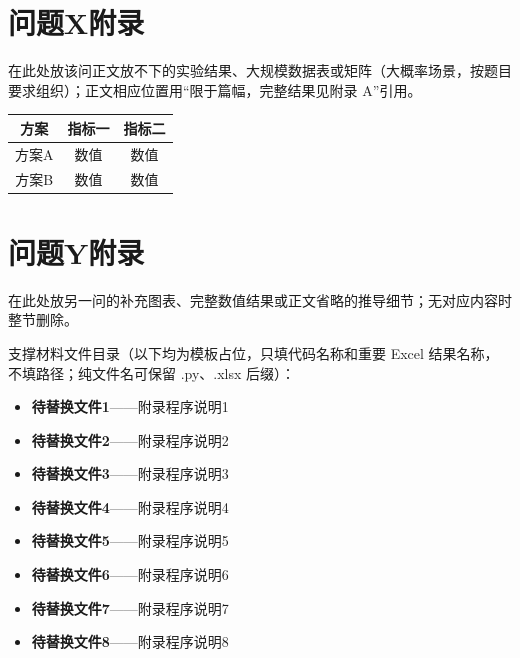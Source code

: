 \documentclass[bwprint]{gmcmthesis}
\begin{document}
\clearpage
\label{appendix:start}
\begin{appendices}

\section{问题X附录}

在此处放该问正文放不下的实验结果、大规模数据表或矩阵（大概率场景，按题目要求组织）；正文相应位置用“限于篇幅，完整结果见附录 A”引用。

\begin{table}[htp!]
\centering
\renewcommand\arraystretch{1.2}
\begin{tabular}{|c|c|c|}
  \hline
  方案  &  指标一  &  指标二 \\
  \hline
  方案A &  数值    &  数值 \\
  \hline
  方案B &  数值    &  数值 \\
  \hline
\end{tabular}
\end{table}

\section{问题Y附录}

在此处放另一问的补充图表、完整数值结果或正文省略的推导细节；无对应内容时整节删除。

\par\noindent\hspace{2em}支撑材料文件目录（以下均为模板占位，只填代码名称和重要 Excel 结果名称，不填路径；纯文件名可保留 .py、.xlsx 后缀）：\par

\newcommand{\AppendixCodeName}[1]{待替换文件#1}

\begin{itemize}[label={},leftmargin=1.9em,itemsep=0.25em,topsep=0.25em]
    \item \textbf{\AppendixCodeName{1}}——附录程序说明1
    \item \textbf{\AppendixCodeName{2}}——附录程序说明2
    \item \textbf{\AppendixCodeName{3}}——附录程序说明3
    \item \textbf{\AppendixCodeName{4}}——附录程序说明4
    \item \textbf{\AppendixCodeName{5}}——附录程序说明5
    \item \textbf{\AppendixCodeName{6}}——附录程序说明6
    \item \textbf{\AppendixCodeName{7}}——附录程序说明7
    \item \textbf{\AppendixCodeName{8}}——附录程序说明8
\end{itemize}


\end{appendices}
\end{document}
